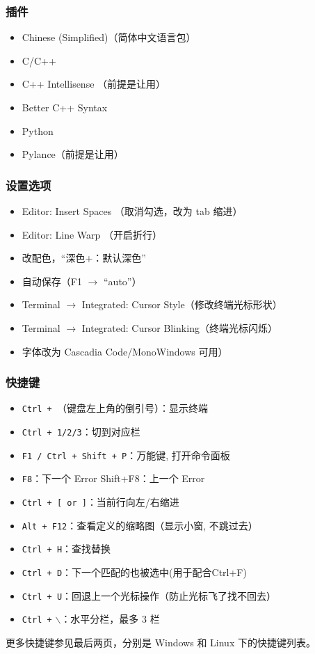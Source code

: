 \subsubsection{插件}

\begin{itemize}
	\item Chinese (Simplified)（简体中文语言包）
	\item C/C++
	\item C++ Intellisense （前提是让用）
	\item Better C++ Syntax
	\item Python
	\item Pylance（前提是让用）
\end{itemize}

\subsubsection{设置选项}

\begin{itemize}
	\item Editor: Insert Spaces （取消勾选，改为 tab 缩进）
	\item Editor: Line Warp （开启折行）
	\item 改配色，``深色+：默认深色''
	\item 自动保存（F1 $\rightarrow$ ``auto''）
	\item Terminal $\to$ Integrated: Cursor Style（修改终端光标形状）
	\item Terminal $\to$ Integrated: Cursor Blinking（终端光标闪烁）
	\item 字体改为 Cascadia Code/MonoWindows 可用）
\end{itemize}

\subsubsection{快捷键}

\begin{itemize}
	\item \texttt{Ctrl + }（键盘左上角的倒引号）：显示终端
	\item \texttt{Ctrl + 1/2/3}：切到对应栏
	\item \texttt{F1 / Ctrl + Shift + P}：万能键, 打开命令面板
	\item \texttt{F8}：下一个 Error \quad Shift+F8：上一个 Error
	\item \texttt{Ctrl + [ or ]}：当前行向左/右缩进
	\item \texttt{Alt + F12}：查看定义的缩略图（显示小窗, 不跳过去）
	\item \texttt{Ctrl + H}：查找替换
	\item \texttt{Ctrl + D}：下一个匹配的也被选中(用于配合Ctrl+F)
	\item \texttt{Ctrl + U}：回退上一个光标操作（防止光标飞了找不回去）
	\item \texttt{Ctrl +} $\backslash$：水平分栏，最多 3 栏
\end{itemize}

更多快捷键参见最后两页，分别是 Windows 和 Linux 下的快捷键列表。
